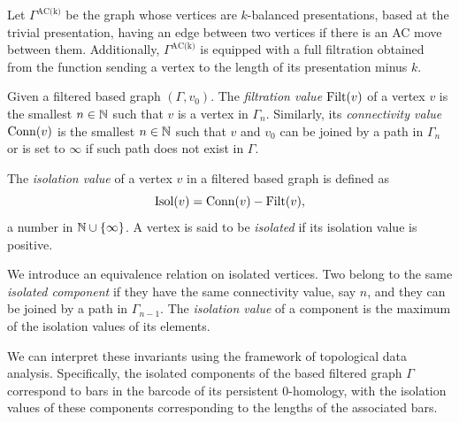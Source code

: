 Let $\Gamma^{\text{AC(k)}}$ be the graph whose vertices are $k$-balanced presentations, based at the trivial presentation, having an edge between two vertices if there is an AC move between them.
Additionally, $\Gamma^{\text{AC(k)}}$ is equipped with a full filtration obtained from the function sending a vertex to the length of its presentation minus $k$.


Given a filtered based graph $(\Gamma, v_0)$.
The \textit{filtration value} $\operatorname{Filt}(v)$ of a vertex $v$ is the smallest $n \in \mathbb{N}$ such that $v$ is a vertex in $\Gamma_n$.
Similarly, its \textit{connectivity value} $\operatorname{Conn}(v)$ is the smallest $n \in \mathbb{N}$ such that $v$ and $v_0$ can be joined by a path in $\Gamma_n$ or is set to $\infty$ if such path does not exist in $\Gamma$.

The \textit{isolation value} of a vertex $v$ in a filtered based graph is defined as
\[
\operatorname{Isol}(v) = \operatorname{Conn}(v) - \operatorname{Filt}(v),
\]
a number in $\mathbb{N} \cup \{\infty\}$.
A vertex is said to be \textit{isolated} if its isolation value is positive.

We introduce an equivalence relation on isolated vertices.
Two belong to the same \textit{isolated component} if they have the same connectivity value, say $n$, and they can be joined by a path in $\Gamma_{n-1}$.
The \textit{isolation value} of a component is the maximum of the isolation values of its elements.

We can interpret these invariants using the framework of topological data analysis.
Specifically, the isolated components of the based filtered graph $\Gamma$ correspond to bars in the barcode of its persistent $0$-homology, with the isolation values of these components corresponding to the lengths of the associated bars.

